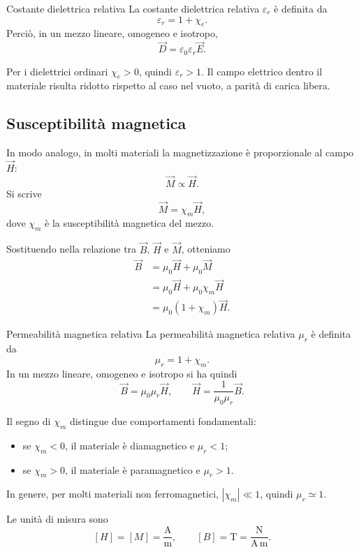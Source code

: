\documentclass[a4paper]{article}
\begin{document}
\begin{snippetdefinition}{Costante dielettrica relativa}
La costante dielettrica relativa \(\varepsilon_r\) è definita da
\[
    \varepsilon_r=1+\chi_e.
\]
Perciò, in un mezzo lineare, omogeneo e isotropo,
\[
    \vec{D}=\varepsilon_0\varepsilon_r\vec{E}.
\]
\end{snippetdefinition}

Per i dielettrici ordinari \(\chi_e>0\), quindi \(\varepsilon_r>1\). Il campo elettrico dentro il materiale risulta ridotto rispetto al caso nel vuoto, a parità di carica libera.

\subsection{Susceptibilità magnetica}

In modo analogo, in molti materiali la magnetizzazione è proporzionale al campo \(\vec{H}\):
\[
\vec{M}\propto\vec{H}.
\]
Si scrive
\[
\vec{M}=\chi_m\vec{H},
\]
dove \(\chi_m\) è la susceptibilità magnetica del mezzo.

Sostituendo nella relazione tra \(\vec{B}\), \(\vec{H}\) e \(\vec{M}\), otteniamo
\begin{align*}
\vec{B}
&=\mu_0\vec{H}+\mu_0\vec{M} \\
&=\mu_0\vec{H}+\mu_0\chi_m\vec{H} \\
&=\mu_0(1+\chi_m)\vec{H}.
\end{align*}

\begin{snippetdefinition}{Permeabilità magnetica relativa}
La permeabilità magnetica relativa \(\mu_r\) è definita da
\[
    \mu_r=1+\chi_m.
\]
In un mezzo lineare, omogeneo e isotropo si ha quindi
\[
    \vec{B}=\mu_0\mu_r\vec{H},
    \qquad
    \vec{H}=\frac{1}{\mu_0\mu_r}\vec{B}.
\]
\end{snippetdefinition}

Il segno di \(\chi_m\) distingue due comportamenti fondamentali:
\begin{itemize}
\item se \(\chi_m<0\), il materiale è diamagnetico e \(\mu_r<1\);
\item se \(\chi_m>0\), il materiale è paramagnetico e \(\mu_r>1\).
\end{itemize}
In genere, per molti materiali non ferromagnetici, \(|\chi_m|\ll 1\), quindi \(\mu_r\simeq 1\).

Le unità di misura sono
\[
[H]=[M]=\frac{\mathrm{A}}{\mathrm{m}},
\qquad
[B]=\mathrm{T}=\frac{\mathrm{N}}{\mathrm{A}\,\mathrm{m}}.
\]
\end{document}
